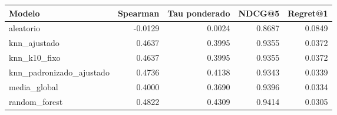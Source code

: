 \begin{tabular}{lrrrr}
\toprule
Modelo & Spearman & Tau ponderado & NDCG@5 & Regret@1 \\
\midrule
aleatorio & -0.0129 & 0.0024 & 0.8687 & 0.0849 \\
knn\_ajustado & 0.4637 & 0.3995 & 0.9355 & 0.0372 \\
knn\_k10\_fixo & 0.4637 & 0.3995 & 0.9355 & 0.0372 \\
knn\_padronizado\_ajustado & 0.4736 & 0.4138 & 0.9343 & 0.0339 \\
media\_global & 0.4000 & 0.3690 & 0.9396 & 0.0334 \\
random\_forest & 0.4822 & 0.4309 & 0.9414 & 0.0305 \\
\bottomrule
\end{tabular}